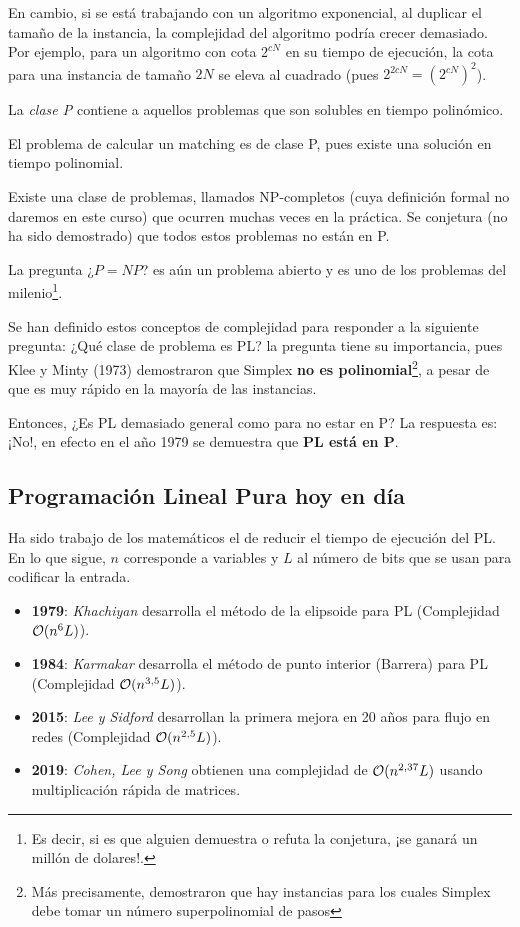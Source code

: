 En cambio, si se está trabajando con un algoritmo exponencial, al duplicar el tamaño de la instancia, la complejidad del algoritmo podría crecer demasiado. Por ejemplo, para un algoritmo con cota $2^{cN}$ en su tiempo de ejecución, la cota para una instancia de tamaño $2N$ se eleva al cuadrado (pues $2^{2cN}=(2^{cN})^2$).

\begin{defi}[Clase P]
La \textit{{clase P}} contiene a aquellos problemas que son solubles en tiempo polinómico.
\end{defi}
\begin{eje}
El problema de calcular un matching es de clase P, pues existe una solución en tiempo polinomial.
\end{eje}

Existe una clase de problemas, llamados NP-completos (cuya definición formal no daremos en este curso) que ocurren muchas veces en la práctica. Se conjetura (no ha sido demostrado) que todos estos problemas no están en P.

\begin{obs}
La pregunta ¿$P=NP$? es aún un problema abierto y es uno de los problemas del milenio\footnote{Es decir, si es que alguien demuestra o refuta la conjetura, ¡se ganará un millón de dolares!.}.
\end{obs}

Se han definido estos conceptos de complejidad para responder a la siguiente pregunta: ¿Qué clase de problema es PL? la pregunta tiene su importancia, pues Klee y Minty (1973) demostraron que Simplex \textbf{no es polinomial}\footnote{Más precisamente, demostraron que hay instancias para los cuales Simplex debe tomar un número superpolinomial de pasos}, a pesar de que es muy rápido en la mayoría de las instancias.

Entonces, ¿Es PL demasiado general como para no estar en P? La respuesta es: ¡No!, en efecto en el año 1979 se demuestra que \textbf{PL está en P}.

\subsection*{Programación Lineal Pura hoy en día}
Ha sido trabajo de los matemáticos el de reducir el tiempo de ejecución del PL. En lo que sigue, $n$ corresponde a variables y $L$ al número de bits que se usan para codificar la entrada.
\begin{itemize}
    \item \textbf{1979}: \textit{Khachiyan} desarrolla el método de la elipsoide para PL (Complejidad $\Ord[n^6L]$).
    \item \textbf{1984}: \textit{Karmakar} desarrolla el método de punto interior (Barrera) para PL (Complejidad $\Ord[n^{3,5}L]$).
    \item \textbf{2015}: \textit{Lee y Sidford} desarrollan la primera mejora en 20 años para flujo en redes (Complejidad $\Ord[n^{2,5}L]$).
    \item \textbf{2019}: \textit{Cohen, Lee y Song} obtienen una complejidad de $\Ord[n^{2,37}L]$ usando multiplicación rápida de matrices.
\end{itemize}


